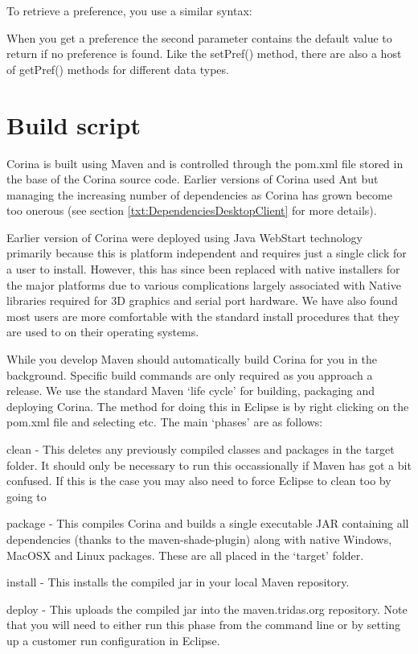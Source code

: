 To retrieve a preference, you use a similar syntax:

When you get a preference the second parameter contains the default value to return if no preference is found.  Like the setPref() method, there are also a host of getPref() methods for different data types.



\section{Build script}
\label{txt:buildScript}
Corina is built using Maven and is controlled through the pom.xml file stored in the base of the Corina source code.  Earlier versions of Corina used Ant but managing the increasing number of dependencies as Corina has grown become too onerous (see section \ref{txt:DependenciesDesktopClient} for more details). 

Earlier version of Corina were deployed using Java WebStart technology primarily because this is platform independent and requires just a single click for a user to install.  However, this has since been replaced with native installers for the major platforms due to various complications largely associated with Native libraries required for 3D graphics and serial port hardware.  We have also found most users are more comfortable with the standard install procedures that they are used to on their operating systems.

While you develop Maven should automatically build Corina for you in the background.  Specific build commands are only required as you approach a release.  We use the standard Maven `life cycle' for building, packaging and deploying Corina.  The method for doing this in Eclipse is by right clicking on the pom.xml file and selecting  etc.  The main `phases' are as follows:

\begin{description*}
 \item[clean] - This deletes any previously compiled classes and packages in the target folder.  It should only be necessary to run this occassionally if Maven has got a bit confused.  If this is the case you may also need to force Eclipse to clean too by going to 
 \item[package] - This compiles Corina and builds a single executable JAR containing all dependencies (thanks to the maven-shade-plugin) along with native Windows, MacOSX and Linux packages.  These are all placed in the `target' folder.
 \item[install] - This installs the compiled jar in your local Maven repository.
 \item[deploy] - This uploads the compiled jar into the maven.tridas.org repository.  Note that you will need to either run this phase from the command line or by setting up a customer run configuration in Eclipse.
\end{description*}




